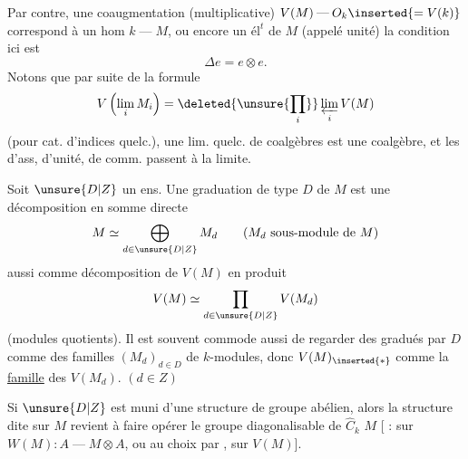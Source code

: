 Par contre, une  coaugmentation (multiplicative)
$V(M)\mathbin{\text{---}}O_k\inserted{=V(k)}$ correspond à un hom $k\mathbin{\text{---}}M$, ou encore un $\mathrm{él}^t$ de $M$ (appelé unité)
la condition ici est
\[
\Delta e=e\otimes e.
\]
Notons que par suite de la formule
\[
V\left(\lim_i M_i\right)=\deleted{\unsure{\prod_i}}\varprojlim_i V(M)
\]
(pour cat. d'indices quelc.), une lim. quelc. de coalgèbres est une coalgèbre, et les  d'ass, d'unité, de comm.
passent à la limite.

Soit  $\unsure{D|Z}$ un ens. Une graduation de type $D$ de $M$ est une décomposition en somme directe
\[
M\simeq\bigoplus_{d\in\unsure{D|Z}}M_d\qquad(M_d\text{ sous-module de }M)
\]
 aussi comme décomposition de $V(M)$ en produit
\[
V(M)\simeq\prod_{d\in\unsure{D|Z}}V(M_d)
\]
(modules quotients). Il est souvent commode aussi de regarder  des  gradués par $D$ comme des familles $(M_d)_{d\in D}$ de $k$-modules, donc $V(M)_{\inserted{*}}$ comme la \uline{famille} des $V(M_d)$. $(d\in Z)$

Si $\unsure{D|Z}$ est muni d'une structure de groupe abélien, alors la structure dite sur $M$ revient à faire opérer le groupe diagonalisable de $\widehat C_k$
 $M$ [ : sur $W(M):A\mathbin{\text{---}}M\otimes A$, ou au choix par
, sur $V(M)$].

